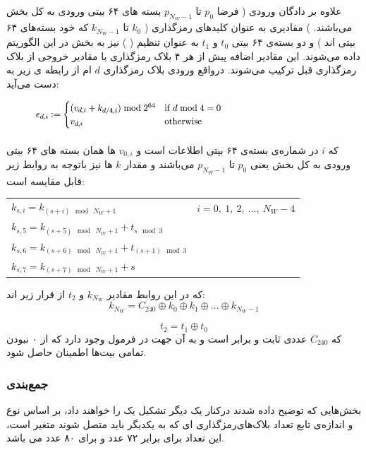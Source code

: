علاوه بر دادگان ورودی ( فرضا 
$p_0$ 
تا
$p_{N_W - 1}$
بسته های ۶۴ بیتی ورودی به کل بخش 
می‌باشند.
)
مقادیری به عنوان کلیدهای رمزگذاری (
$k_0$ 
تا
$k_{N_W - 1}$
که خود بسته‌های ۶۴ بیتی اند
)
و
دو بسته‌ی ۶۴ بیتی 
$t_0$ 
و
$t_1$
به عنوان تنظیم (
) 
نیز به ‌بخش 
در این الگوریتم داده می‌شوند. این مقادیر اضافه پیش از هر ۴ بلاک رمزگذاری با مقادیر خروجی از بلاک رمزگذاری قبل ترکیب می‌شوند. درواقع ورودی بلاک رمزگذاری $d$ ام از رابطه ی زیر به دست می‌آید:
\begin{figure}[H]
	\centering
	\includegraphics[width=7cm]{Images/Introduction/subkey_equation_1.png}	
	
\end{figure}
که $i$ در شماره‌ی بسته‌ی ۶۴ بیتی اطلاعات است و $v_{0,i}$ ها همان بسته های ۶۴ بیتی ورودی به کل بخش 
یعنی 
$p_0$ 
تا
$p_{N_W - 1}$
می‌باشند  و مقدار $k$ ها نیز با‌توجه به روابط زیر قابل مقایسه است:
	\begin{latin}
		\begin{center}
			\begin{tabular}{l l}
				$k_{s, i} = k_{(s+i) \mod\ N_W+1} $ \hspace{15mm} & $  i = 0,\ 1,\ 2,\ ... ,\ N_W-4 $ \\
				$k_{s, 5} = k_{(s+5) \mod\ N_W+1} + t_{s \mod 3}$ & \\
				$k_{s, 6} = k_{(s+6) \mod\ N_W+1} + t_{(s+1) \mod 3}$ & \\
				$k_{s, 7} = k_{(s+7) \mod\ N_W+1} + s $ & \\
				
			\end{tabular}
		\end{center}
	\end{latin}

که در این روابط مقادیر $k_{N_W}$ و
$t_2$
از قرار زیر اند:
$$
k_{N_W} = C_{240} \oplus k_0 \oplus k_1 \oplus ... \oplus k_{N_W - 1}
$$

$$
t_2 = t_1 \oplus t_0
$$
که $ C_{240} $ عددی ثابت و برابر  است و به آن جهت در فرمول وجود دارد که از ۰ نبودن تمامی بیت‌ها اطمینان حاصل شود.

\subsubsection{جمع‌بندی}
بخش‌هایی که توضیح داده شدند در‌کنار یک دیگر تشکیل یک 
را خواهند داد، بر اساس نوع و اندازه‌ی تابع 
تعداد بلاک‌های‌رمزگذاری ای که به یکدیگر باید متصل شوند متغیر است، این تعداد برای 
برابر ۷۲ عدد و برای 
۸۰ عدد می باشد.


